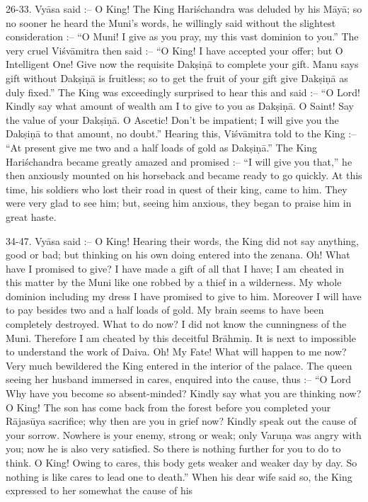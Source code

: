 26-33. Vy\=asa said :-- O King! The King Hari\'schandra was deluded by his M\=ay\=a; so no sooner he heard the Muni's words, he willingly said without the slightest consideration :-- ``O Muni! I give as you pray, my this vast dominion to you.'' The very cruel Vi\'sv\=amitra then said :-- ``O King! I have accepted your offer; but O Intelligent One! Give now the requisite Dak\d{s}i\d{n}\=a to complete your gift. Manu says gift without Dak\d{s}i\d{n}\=a is fruitless; so to get the fruit of your gift give Dak\d{s}i\d{n}\=a as duly fixed.'' The King was exceedingly surprised to hear this and said :-- ``O Lord! Kindly say what amount of wealth am I to give to you as Dak\d{s}i\d{n}\=a. O Saint! Say the value of your Dak\d{s}i\d{n}\=a. O Ascetic! Don't be impatient; I will give you the Dak\d{s}i\d{n}\=a to that amount, no doubt.'' Hearing this, Vi\'sv\=amitra told to the King :-- ``At present give me two and a half loads of gold as Dak\d{s}i\d{n}\=a.'' The King Hari\'schandra became greatly amazed and promised :-- ``I will give you that,'' he then anxiously mounted on his horseback and became ready to go quickly. At this time, his soldiers who lost their road in quest of their king, came to him. They were very glad to see him; but, seeing him anxious, they began to praise him in great haste.

34-47. Vy\=asa said :-- O King! Hearing their words, the King did not say anything, good or bad; but thinking on his own doing entered into the zenana. Oh! What have I promised to give? I have made a gift of all that I have; I am cheated in this matter by the Muni like one robbed by a thief in a wilderness. My whole dominion including my dress I have promised to give to him. Moreover I will have to pay besides two and a half loads of gold. My brain seems to have been completely destroyed. What to do now? I did not know the cunningness of the Muni. Therefore I am cheated by this deceitful Br\=ahmi\d{n}. It is next to impossible to understand the work of Daiva. Oh! My Fate! What will happen to me now? Very much bewildered the King entered in the interior of the palace. The queen seeing her husband immersed in cares, enquired into the cause, thus :-- ``O Lord Why have you become so absent-minded? Kindly say what you are thinking now? O King! The son has come back from the forest before you completed your R\=ajas\=uya sacrifice; why then are you in grief now? Kindly speak out the cause of your sorrow. Nowhere is your enemy, strong or weak; only Varu\d{n}a was angry with you; now he is also very satisfied. So there is nothing further for you to do to think. O King! Owing to cares, this body gets weaker and weaker day by day. So nothing is like cares to lead one to death.'' When his dear wife said so, the King expressed to her somewhat the cause of his

